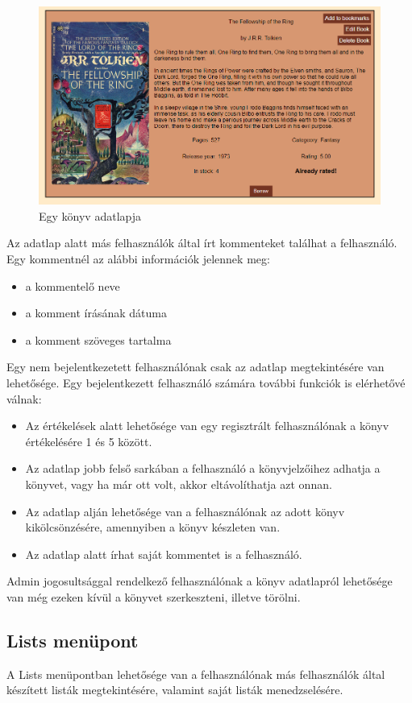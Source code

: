 \begin{figure}[H]
    \centering
    \includegraphics[scale=0.55]{images/application/bookcard.png}
    \caption{Egy könyv adatlapja}
\end{figure}

Az adatlap alatt más felhasználók által írt kommenteket találhat a felhasználó. Egy kommentnél az alábbi információk jelennek meg:
\begin{itemize}
    \item a kommentelő neve
    \item a komment írásának dátuma
    \item a komment szöveges tartalma
\end{itemize}
Egy nem bejelentkezetett felhasználónak csak az adatlap megtekintésére van lehetősége. Egy bejelentkezett felhasználó számára további funkciók is elérhetővé válnak:
\begin{itemize}
    \item Az értékelések alatt lehetősége van egy regisztrált felhasználónak a könyv értékelésére 1 és 5 között.
    \item  Az adatlap jobb felső sarkában a felhasználó a könyvjelzőihez adhatja a könyvet, vagy ha már ott volt, akkor eltávolíthatja azt onnan.
    \item  Az adatlap alján lehetősége van a felhasználónak az adott könyv kikölcsönzésére, amennyiben a könyv készleten van.
    \item  Az adatlap alatt írhat saját kommentet is a felhasználó.
\end{itemize}
 Admin jogosultsággal rendelkező felhasználónak a könyv adatlapról lehetősége van még ezeken kívül a könyvet szerkeszteni, illetve törölni.

\subsection{Lists menüpont}
A Lists menüpontban lehetősége van a felhasználónak más felhasználók által készített listák megtekintésére, valamint saját listák menedzselésére. 

